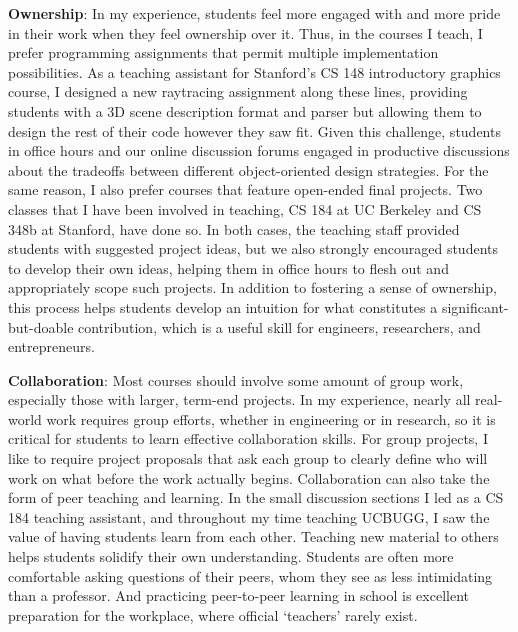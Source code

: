 \documentclass[
10pt, %
a4paper, %
oneside, %
headinclude,footinclude, %
BCOR5mm, %
]{scrartcl}
\begin{document}
\textbf{Ownership}:
In my experience, students feel more engaged with and more pride in their work when they feel ownership over it. Thus, in the courses I teach, I prefer programming assignments that permit multiple implementation possibilities. As a teaching assistant for Stanford's CS 148 introductory graphics course, I designed a new raytracing assignment along these lines, providing students with a 3D scene description format and parser but allowing them to design the rest of their code however they saw fit. Given this challenge, students in office hours and our online discussion forums engaged in productive discussions about the tradeoffs between different object-oriented design strategies. For the same reason, I also prefer courses that feature open-ended final projects. Two classes that I have been involved in teaching, CS 184 at UC Berkeley and CS 348b at Stanford, have done so. In both cases, the teaching staff provided students with suggested project ideas, but we also strongly encouraged students to develop their own ideas, helping them in office hours to flesh out and appropriately scope such projects. In addition to fostering a sense of ownership, this process helps students develop an intuition for what constitutes a significant-but-doable contribution, which is a useful skill for engineers, researchers, and entrepreneurs.

\textbf{Collaboration}:
Most courses should involve some amount of group work, especially those with larger, term-end projects. In my experience, nearly all real-world work requires group efforts, whether in engineering or in research, so it is critical for students to learn effective collaboration skills. For group projects, I like to require project proposals that ask each group to clearly define who will work on what before the work actually begins.
Collaboration can also take the form of peer teaching and learning. In the small discussion sections I led as a CS 184 teaching assistant, and throughout my time teaching UCBUGG, I saw the value of having students learn from each other. Teaching new material to others helps students solidify their own understanding. Students are often more comfortable asking questions of their peers, whom they see as less intimidating than a professor. And practicing peer-to-peer learning in school is excellent preparation for the workplace, where official `teachers' rarely exist.
\end{document}
